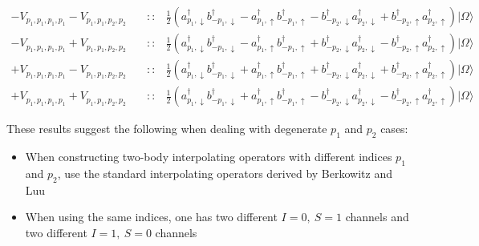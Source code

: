 \documentclass[
  letterpaper,
  DIV=11,
  numbers=noendperiod]{scrartcl}
\begin{document}
\begin{tcolorbox}[enhanced jigsaw, arc=.35mm, bottomrule=.15mm, bottomtitle=1mm, breakable, colback=white, colbacktitle=quarto-callout-note-color!10!white, colframe=quarto-callout-note-color-frame, coltitle=black, left=2mm, leftrule=.75mm, opacityback=0, opacitybacktitle=0.6, rightrule=.15mm, title=\textcolor{quarto-callout-note-color}{\faInfo}\hspace{0.5em}{\(I_z=0,\ S_z=0\) continued}, titlerule=0mm, toprule=.15mm, toptitle=1mm]

\begin{align}
-V_{p_1,p_1,p_1,p_1}-V_{p_1,p_1,p_2,p_2} &\quad :: & \frac{1}{2}\left(a^\dagger_{p_1,\downarrow}b^\dagger_{-p_1,\downarrow}-a^\dagger_{p_1,\uparrow}b^\dagger_{-p_1,\uparrow}-b^\dagger_{-p_2,\downarrow}a^\dagger_{p_2,\downarrow}+b^\dagger_{-p_2,\uparrow}a^\dagger_{p_2,\uparrow}\right)|\Omega\rangle\\
-V_{p_1,p_1,p_1,p_1}+V_{p_1,p_1,p_2,p_2} &\quad :: & \frac{1}{2}\left(a^\dagger_{p_1,\downarrow}b^\dagger_{-p_1,\downarrow}-a^\dagger_{p_1,\uparrow}b^\dagger_{-p_1,\uparrow}+b^\dagger_{-p_2,\downarrow}a^\dagger_{p_2,\downarrow}-b^\dagger_{-p_2,\uparrow}a^\dagger_{p_2,\uparrow}\right)|\Omega\rangle\\
+V_{p_1,p_1,p_1,p_1}-V_{p_1,p_1,p_2,p_2} &\quad :: & \frac{1}{2}\left(a^\dagger_{p_1,\downarrow}b^\dagger_{-p_1,\downarrow}+a^\dagger_{p_1,\uparrow}b^\dagger_{-p_1,\uparrow}+b^\dagger_{-p_2,\downarrow}a^\dagger_{p_2,\downarrow}+b^\dagger_{-p_2,\uparrow}a^\dagger_{p_2,\uparrow}\right)|\Omega\rangle\\
+V_{p_1,p_1,p_1,p_1}+V_{p_1,p_1,p_2,p_2} &\quad :: & \frac{1}{2}\left(a^\dagger_{p_1,\downarrow}b^\dagger_{-p_1,\downarrow}+a^\dagger_{p_1,\uparrow}b^\dagger_{-p_1,\uparrow}-b^\dagger_{-p_2,\downarrow}a^\dagger_{p_2,\downarrow}-b^\dagger_{-p_2,\uparrow}a^\dagger_{p_2,\uparrow}\right)|\Omega\rangle
\end{align}

\end{tcolorbox}

These results suggest the following when dealing with degenerate \(p_1\)
and \(p_2\) cases:

\begin{itemize}
\item
  When constructing two-body interpolating operators with different
  indices \(p_1\) and \(p_2\), use the standard interpolating operators
  derived by Berkowitz and Luu
\item
  When using the same indices, one has two different \(I=0,\ S=1\)
  channels and two different \(I=1,\  S=0\) channels
\end{itemize}
\end{document}
